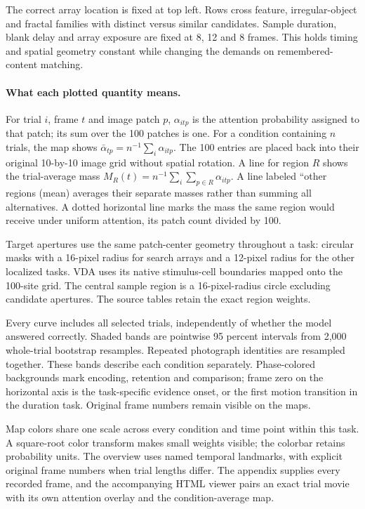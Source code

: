 \documentclass[11pt]{article}
\begin{document}
The correct array location is fixed at top left. Rows cross feature, irregular-object and fractal families with distinct versus similar candidates. Sample duration, blank delay and array exposure are fixed at 8, 12 and 8 frames. This holds timing and spatial geometry constant while changing the demands on remembered-content matching.

\paragraph{What each plotted quantity means.}
For trial $i$, frame $t$ and image patch $p$, $\alpha_{itp}$ is the attention probability assigned to that patch; its sum over the 100 patches is one. For a condition containing $n$ trials, the map shows $\bar\alpha_{tp}=n^{-1}\sum_i\alpha_{itp}$. The 100 entries are placed back into their original 10-by-10 image grid without spatial rotation. A line for region $R$ shows the trial-average mass $M_R(t)=n^{-1}\sum_i\sum_{p\in R}\alpha_{itp}$. A line labeled ``other regions (mean) averages their separate masses rather than summing all alternatives. A dotted horizontal line marks the mass the same region would receive under uniform attention, its patch count divided by 100.

Target apertures use the same patch-center geometry throughout a task: circular masks with a 16-pixel radius for search arrays and a 12-pixel radius for the other localized tasks. VDA uses its native stimulus-cell boundaries mapped onto the 100-site grid. The central sample region is a 16-pixel-radius circle excluding candidate apertures. The source tables retain the exact region weights.

Every curve includes all selected trials, independently of whether the model answered correctly. Shaded bands are pointwise 95 percent intervals from 2,000 whole-trial bootstrap resamples. Repeated photograph identities are resampled together. These bands describe each condition separately. Phase-colored backgrounds mark encoding, retention and comparison; frame zero on the horizontal axis is the task-specific evidence onset, or the first motion transition in the duration task. Original frame numbers remain visible on the maps.

Map colors share one scale across every condition and time point within this task. A square-root color transform makes small weights visible; the colorbar retains probability units. The overview uses named temporal landmarks, with explicit original frame numbers when trial lengths differ. The appendix supplies every recorded frame, and the accompanying HTML viewer pairs an exact trial movie with its own attention overlay and the condition-average map.
\end{document}
